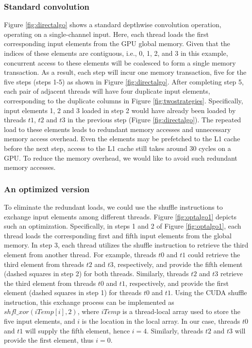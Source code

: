 \subsubsection{Standard convolution} Figure \ref{fig:directalgo} shows a standard depthwise convolution operation, operating on a single-channel input. Here, each thread loads the first corresponding input elements from the GPU global memory. Given that the
indices of these elements are contiguous, i.e., 0, 1, 2, and 3 in this example, concurrent access to these elements will be coalesced to
form a single memory transaction. As a result, each step will incur one memory transaction, five for the five steps (steps 1-5) as shown in
Figure \ref{fig:directalgo}. After completing step 5, each pair of adjacent threads will have four duplicate input elements, corresponding
to the duplicate columns in Figure \ref{fig:twostrategies}. Specifically, input elements 1, 2 and 3 loaded in step 2 would have already
been loaded by threads $t1$, $t2$ and $t3$ in the previous step (Figure \ref{fig:directalgo}). The repeated load to these elements leads to
redundant memory accesses and unnecessary memory access overhead. Even the elements may be prefetched to the L1 cache before the next step,
access to the L1 cache still takes around 30 cycles on a GPU. To reduce the memory overhead, we would like to avoid such redundant memory
accesses.


\subsubsection{An optimized version} To eliminate the redundant loads, we could use the shuffle instructions to exchange input elements among
different threads.   Figure \ref{fig:optalgo1} depicts such an optimization. Specifically, in steps 1 and 2 of Figure \ref{fig:optalgo1},
each thread loads the corresponding first and fifth input elements from the global memory. In step 3, each thread utilizes the shuffle
instruction to retrieve the third element from another thread. For example, threads $t0$ and $t1$ could retrieve the third element from
threads $t2$ and $t3$, respectively, and provide the fifth element (dashed squares in step 2) for both threads. Similarly, threads $t2$ and
$t3$ retrieve the third element from threads $t0$ and $t1$, respectively, and provide the first element (dashed squares in step 1) for
threads $t0$ and $t1$. Using the CUDA shuffle instruction, this exchange process can be implemented as $shfl\_xor(iTemp[i],2)$, where
$iTemp$ is a thread-local array used to store the five input elements, and $i$ is the location in the local array. In our case, threads
$t0$ and $t1$ will supply the fifth element, hence $i=4$. Similarly, threads $t2$ and $t3$ will provide the first element, thus $i=0$.



